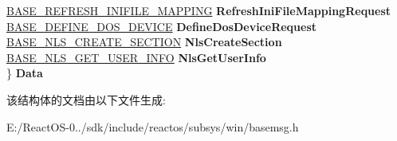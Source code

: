 \begin{DoxyCompactItemize}
\begin{tabbing}
\>\hyperlink{struct___b_a_s_e___r_e_f_r_e_s_h___i_n_i_f_i_l_e___m_a_p_p_i_n_g}{BASE\_REFRESH\_INIFILE\_MAPPING} {\bfseries RefreshIniFileMappingRequest}\\
\>\hyperlink{struct___b_a_s_e___d_e_f_i_n_e___d_o_s___d_e_v_i_c_e}{BASE\_DEFINE\_DOS\_DEVICE} {\bfseries DefineDosDeviceRequest}\\
\>\hyperlink{struct___b_a_s_e___n_l_s___c_r_e_a_t_e___s_e_c_t_i_o_n}{BASE\_NLS\_CREATE\_SECTION} {\bfseries NlsCreateSection}\\
\>\hyperlink{struct___b_a_s_e___n_l_s___g_e_t___u_s_e_r___i_n_f_o}{BASE\_NLS\_GET\_USER\_INFO} {\bfseries NlsGetUserInfo}\\
\} {\bfseries Data}\\

\end{tabbing}\end{DoxyCompactItemize}


该结构体的文档由以下文件生成\+:\begin{DoxyCompactItemize}
\item 
E\+:/\+React\+O\+S-\/0../sdk/include/reactos/subsys/win/basemsg.\+h\end{DoxyCompactItemize}
